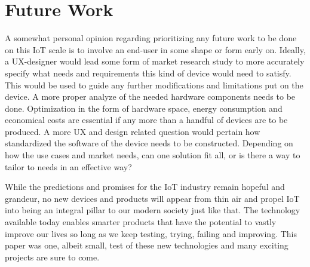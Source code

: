 \iffalse
\begin{itemize}
	\item Critique
	\item Discussion
	\item Do not make the reader do all the work
\end{itemize}
\fi

\section{Future Work}
A somewhat personal opinion regarding prioritizing any future work to be done on this IoT scale is to involve an end-user in some shape or form early on. Ideally, a UX-designer would lead some form of market research study to more accurately specify what needs and requirements this kind of device would need to satisfy. This would be used to guide any further modifications and limitations put on the device.
A more proper analyze of the needed hardware components needs to be done. Optimization in the form of hardware space, energy consumption and economical costs are essential if any more than a handful of devices are to be produced.
A more UX and design related question would pertain how standardized the software of the device needs to be constructed. Depending on how the use cases and market needs, can one solution fit all, or is there a way to tailor to needs in an effective way?


While the predictions and promises for the IoT industry remain hopeful and grandeur, no new devices and products will appear from thin air and propel IoT into being an integral pillar to our modern society just like that. The technology available today enables smarter products that have the potential to vastly improve our lives so long as we keep testing, trying, failing and improving. This paper was one, albeit small, test of these new technologies and many exciting projects are sure to come.